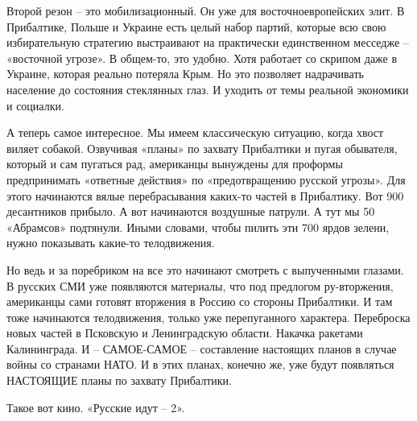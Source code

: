 Второй резон – это мобилизационный. Он уже для восточноевропейских элит. В
Прибалтике, Польше и Украине есть целый набор партий, которые всю свою
избирательную стратегию выстраивают на практически единственном месседже –
«восточной угрозе». В общем-то, это удобно. Хотя работает со скрипом даже в
Украине, которая реально потеряла Крым. Но это позволяет надрачивать население
до состояния стеклянных глаз. И уходить от темы реальной экономики и социалки.

А теперь самое интересное. Мы имеем классическую ситуацию, когда хвост виляет
собакой. Озвучивая «планы» по захвату Прибалтики и пугая обывателя, который и
сам пугаться рад, американцы вынуждены для проформы предпринимать «ответные
действия» по «предотвращению русской угрозы». Для этого начинаются вялые
перебрасывания каких-то частей в Прибалтику. Вот 900 десантников прибыло. А вот
начинаются воздушные патрули. А тут мы 50 «Абрамсов» подтянули. Иными словами,
чтобы пилить эти 700 ярдов зелени, нужно показывать какие-то телодвижения.

Но ведь и за поребриком на все это начинают смотреть с выпученными глазами. В
русских СМИ уже появляются материалы, что под предлогом ру-вторжения,
американцы сами готовят вторжения в Россию со стороны Прибалтики. И там тоже
начинаются телодвижения, только уже перепуганного характера. Переброска новых
частей в Псковскую и Ленинградскую области. Накачка ракетами Калининграда. И –
САМОЕ-САМОЕ – составление настоящих планов в случае войны со странами НАТО. И в
этих планах, конечно же, уже будут появляться НАСТОЯЩИЕ планы по захвату
Прибалтики.

Такое вот кино. «Русские идут – 2».

